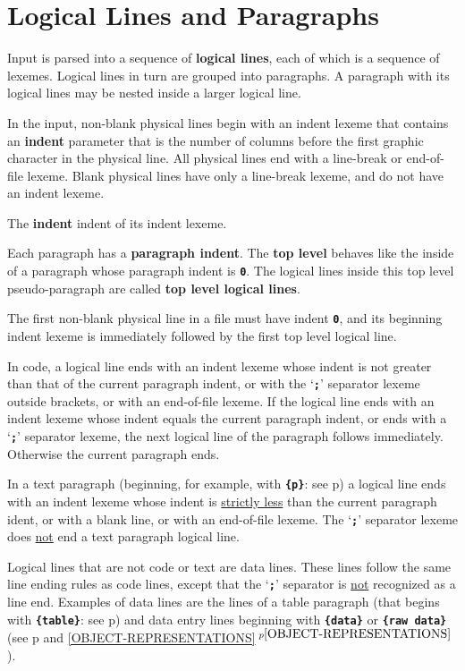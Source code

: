 \documentclass[12pt]{article}
\newcommand{\TT}[1]{{\tt \bfseries #1}}
\newcommand{\key}[1]{{\rm \bfseries #1}}
\newcommand{\itemref}[1]{\ref{#1}$\,^{p\pageref{#1}}$}
\newcommand{\pagref}[1]{p\pageref{#1}}
\begin{document}
\clearpage

\section{Logical Lines and Paragraphs}
\label{LOGICAL-LINES-AND-PARAGRAPHS}

Input is parsed into a sequence of
\key{logical lines},\label{LOGICAL-LINE} each of which is
a sequence of lexemes.  Logical lines in turn are grouped into
paragraphs.  A paragraph with its logical lines may be nested inside
a larger logical line.

In the input, non-blank
physical lines begin with an indent lexeme that
contains an \key{indent}
parameter that is the number of columns before the first
graphic character in the physical line.  All physical lines end with a
line-break or end-of-file lexeme.  Blank physical lines have
only a line-break lexeme, and do not have an indent lexeme.

The \key{indent}
indent of its indent lexeme.

Each paragraph has a \key{paragraph indent}.
The \key{top level} behaves like the inside of a paragraph
whose paragraph indent is \TT{0}.  The logical lines inside
this top level pseudo-paragraph are called \key{top level logical lines}.

The first non-blank physical line in a file must have indent \TT{0},
and its beginning indent lexeme is immediately followed
by the first top level logical line.

In code, a logical line ends with an indent lexeme whose indent is
not greater than that of the current paragraph indent,
or with the `\TT{;}' separator lexeme outside brackets,
or with an end-of-file lexeme.
If the logical line ends with an indent lexeme whose indent equals
the current paragraph indent, or ends with a `\TT{;}' separator lexeme,
the next logical line of the paragraph follows immediately.  Otherwise
the current paragraph ends.

In a text paragraph (beginning, for example, with \TT{\{p\}}:
see \pagref{TEXT-PARAGRAPH})
a logical line ends with an indent lexeme whose indent is
\underline{strictly less} than the current paragraph ident, or with
a blank line, or with an end-of-file lexeme.  The `\TT{;}' separator
lexeme does \underline{not} end a text paragraph logical line.

Logical lines that are not code or text are data lines.  These lines
follow the same line ending rules as code lines, except that the
`\TT{;}' separator is \underline{not} recognized as a line end.
Examples of data lines are the lines of a table paragraph
(that begins with \TT{\{table\}}: see \pagref{TABLE-PARAGRAPH})
and data entry lines beginning with
\TT{\{data\}} or \TT{\{raw data\}} (see \pagref{DATA-ENTRY-LINE} and
\itemref{OBJECT-REPRESENTATIONS}).
\end{document}
